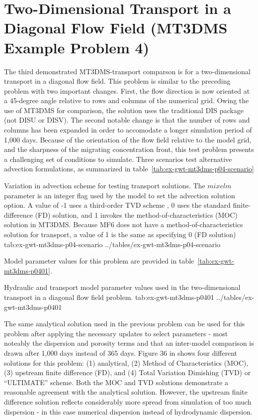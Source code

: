\section{Two-Dimensional Transport in a Diagonal Flow Field (MT3DMS Example Problem 4)}

The third demonstrated MT3DMS-\mf transport comparson is for a two-dimensional transport in a diagonal flow field. This problem is similar to the preceding problem with two important changes. First, the flow direction is now oriented at a 45-degree angle relative to rows and columns of the numerical grid. Owing the use of MT3DMS for comparison, the \mf solution uses the traditional DIS package (not DISU or DISV).  The second notable change is that the number of rows and columns has been expanded in order to accomodate a longer simulation period of 1,000 days. Because of the orientation of the flow field relative to the model grid, and the sharpness of the migrating concentration front, this test problem presents a challenging set of conditions to simulate. Three scenarios test alternative advection formulations, as summarized in table~\ref{tab:ex-gwt-mt3dms-p04-scenario}

\begin{ScenarioTable}{
       Variation in advection scheme for testing transport solutions. The $mixelm$ parameter is an integer flag used by the model to set the advection solution option.  A value of -1 uses a third-order TVD scheme \citep{zheng1999mt3dms}, 0 uses the standard finite-difference (FD) solution, and 1 invokes the method-of-characteristics (MOC) solution in MT3DMS.  Because MF6 does not have a method-of-characteristics solution for transport, a value of 1 is the same as specifying 0 (FD solution)}
       {tab:ex-gwt-mt3dms-p04-scenario}
       {../tables/ex-gwt-mt3dms-p04-scenario}
\end{ScenarioTable}

Model parameter values for this problem are provided in table~\ref{tab:ex-gwt-mt3dms-p0401}.

\begin{StandardTable}
	{Hydraulic and transport model parameter values used in the two-dimensional transport in a diagonal flow field problem.}
	{tab:ex-gwt-mt3dms-p0401}
	{../tables/ex-gwt-mt3dms-p0401}
\end{StandardTable}

The same analytical solution used in the previous problem can be used for this problem after applying the necessary updates to select parameters - most noteably the dispersion and porosity terms and that an inter-model comparison is drawn after 1,000 days instead of 365 days. Figure 36 in \cite{zheng1999mt3dms} shows four different solutions for this problem: (1) analytical, (2) Method of Characteristics (MOC), (3) upstream finite difference (FD), and (4) Total Variation Dimishing (TVD) or ``ULTIMATE'' scheme.  Both the MOC and TVD solutions demonstrate a reasonable agreement with the analytical solution. However, the upstream finite difference solution reflects considerably more spread from simulation of too much dispersion - in this case numerical dispersion instead of hydrodynamic dispersion. 

